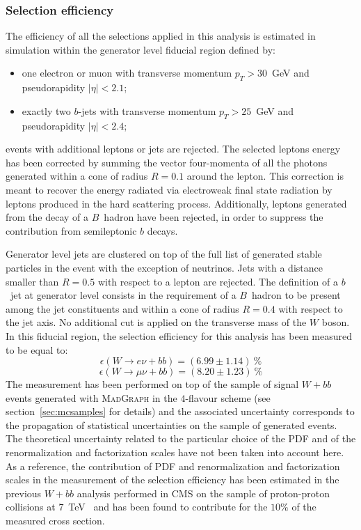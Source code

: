 \subsubsection{Selection efficiency}
\label{sec:genlevelEfficiency}

The efficiency of all the selections applied in this analysis
is estimated in simulation within 
the generator level fiducial region defined by:
\begin{itemize}
  \item one electron or muon with transverse momentum $p_{T} > 30$~GeV and 
    pseudorapidity $|\eta| < 2.1$;
  \item exactly two $b$-jets with transverse momentum $p_{T} > 25$~GeV and 
    pseudorapidity $|\eta| < 2.4$;
\end{itemize}
events with additional leptons or jets are rejected.
The selected leptons energy has been corrected by summing 
the vector four-momenta of 
all the photons generated within a cone of radius $R = 0.1$
around the lepton. This correction is meant to recover the 
energy radiated via electroweak final state radiation 
by leptons produced in the hard scattering process.
Additionally, leptons generated from the decay of a $B$~hadron have 
been rejected, in order to suppress the contribution from 
semileptonic $b$ decays.

Generator level jets are clustered on top of the full list of generated 
stable particles in the event with the exception of neutrinos.
Jets with a distance smaller than $R = 0.5$ with respect to a 
lepton are rejected.
The definition of a 
$b$~jet at generator level consists in the requirement of a $B$~hadron to be 
present among the jet constituents and within a cone of radius $R = 0.4$ 
with respect to the jet axis.
No additional cut is applied on the transverse mass of the $W$ boson.
In this fiducial region, the selection efficiency for this analysis has 
been measured to be equal to:
$$\epsilon (W \rightarrow e \nu + bb) = (6.99 \pm 1.14) ~ \% $$
$$\epsilon (W \rightarrow \mu \nu + bb) = (8.20 \pm 1.23) ~ \% $$
The measurement has been performed on top of the sample of signal $W + bb$ events 
generated with \textsc{MadGraph} in the $4$-flavour scheme (see section~\ref{sec:mcsamples}
for details) and the associated uncertainty corresponds to the propagation of statistical 
uncertainties on the sample of generated events.
The theoretical uncertainty related to the particular choice of 
the PDF and of the renormalization and factorization scales have not been taken into account here. 
As a reference, the contribution of PDF and 
renormalization and factorization scales in the 
measurement of the selection efficiency has been 
estimated in the previous $W + bb$ analysis performed 
in CMS on the sample of proton-proton collisions at $7$~TeV~\cite{cmsWbb7tev} and 
has been found to contribute for the $10\%$ of the measured cross section.


